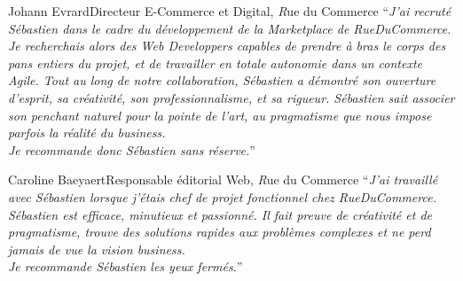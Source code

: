 \documentclass[]{friggeri}
\begin{document}
\begin{quoting}{Johann Evrard}{Directeur E-Commerce et Digital, {\emph Rue du Commerce}}
``\textit{J'ai recruté Sébastien dans le cadre du développement de la
Marketplace de RueDuCommerce. Je recherchais alors des Web Developpers
capables de prendre à bras le corps des pans entiers du projet, et de
travailler en totale autonomie dans un contexte Agile.
Tout au long de notre collaboration, Sébastien a démontré son ouverture
d'esprit, sa créativité, son professionnalisme, et sa rigueur. Sébastien sait
associer son penchant naturel pour la pointe de l'art, au pragmatisme que nous
impose parfois la réalité du business.\\
Je recommande donc Sébastien sans réserve.}''
\end{quoting}

\begin{quoting}{Caroline Baeyaert}{Responsable éditorial Web, {\emph Rue du Commerce}}
``\textit{J'ai travaillé avec Sébastien lorsque j'étais chef de projet fonctionnel
chez RueDuCommerce. Sébastien est efficace, minutieux et passionné. Il fait
preuve de créativité et de pragmatisme, trouve des solutions rapides aux
problèmes complexes et ne perd jamais de vue la vision business.\\
Je recommande Sébastien les yeux fermés.}''
\end{quoting}
\end{document}
